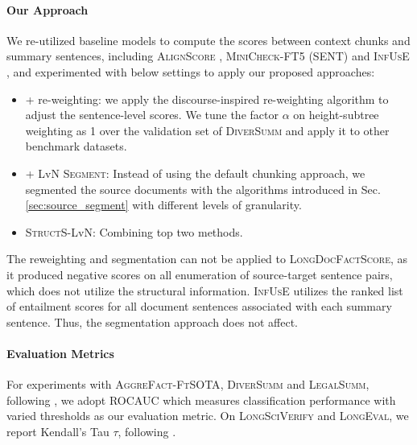 \paragraph{Our Approach}

We re-utilized  baseline models to compute the scores between context chunks and summary sentences, including \textsc{AlignScore} \cite{zha-etal-2023-alignscore}, \textsc{MiniCheck-FT5} (SENT) and \textsc{InfUsE} \cite{zhang-etal-2024-fine}, and experimented with below settings to apply our proposed approaches:
\begin{itemize}
\itemsep0em 
    \item + re-weighting: we apply the discourse-inspired re-weighting algorithm to adjust the sentence-level scores. We tune the factor $\alpha$ on height-subtree weighting as 1 over the validation set of \textsc{DiverSumm} and apply it to other benchmark datasets.
    \item + LvN \textsc{Segment}: Instead of using the default chunking approach, we segmented the source documents with the algorithms introduced in Sec. \ref{sec:source_segment} with different levels of granularity. 
    \item \textsc{StructS}-LvN: Combining top two methods.
\end{itemize}

The reweighting and segmentation can not be applied to \textsc{LongDocFactScore}, as it produced negative scores on all enumeration of source-target sentence pairs, which does not utilize the structural information. \textsc{InfUsE} utilizes the ranked list of entailment scores for all document sentences associated with each summary sentence. Thus, the segmentation approach does not affect.  
\vspace{-2.5mm}
\paragraph{Evaluation Metrics}

For experiments with {\textsc{AggreFact-FtSOTA}, \textsc{DiverSumm}} and \textsc{LegalSumm}, following \citet{laban2022summac, zhang-etal-2024-fine}, we adopt ROCAUC which measures classification
performance with varied thresholds as our evaluation metric.
On \textsc{LongSciVerify} and \textsc{LongEval}, we report Kendall's Tau $\tau$, following \citet{bishop-etal-2024-longdocfactscore-evaluating}.

